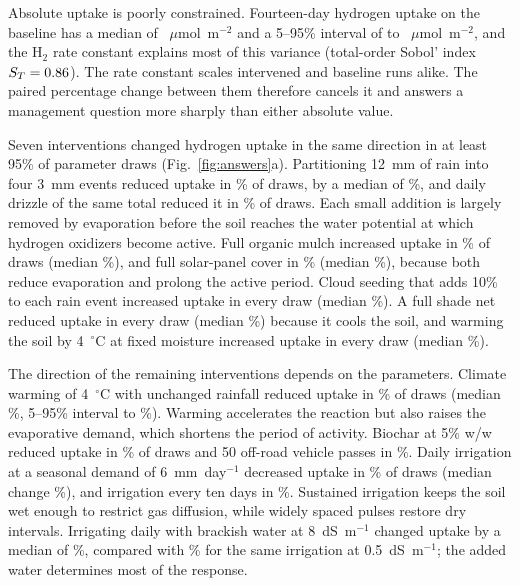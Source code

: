 \documentclass[11pt,a4paper]{article}
\begin{document}
Absolute uptake is poorly constrained. Fourteen-day hydrogen uptake on the baseline has a median of \QBaseHtwoMedian{}~$\mu$mol~m$^{-2}$ and a 5--95\% interval of \QBaseHtwoLow{} to \QBaseHtwoHigh{}~$\mu$mol~m$^{-2}$, and the H$_2$ rate constant explains most of this variance (total-order Sobol' index $S_T=0.86$). The rate constant scales intervened and baseline runs alike. The paired percentage change between them therefore cancels it and answers a management question more sharply than either absolute value.

Seven interventions changed hydrogen uptake in the same direction in at least 95\% of parameter draws (Fig.~\ref{fig:answers}a). Partitioning 12~mm of rain into four 3~mm events reduced uptake in \QRainFourPneg\% of draws, by a median of \QRainFourMedian\%, and daily drizzle of the same total reduced it in \QRainDrizzlePneg\% of draws. Each small addition is largely removed by evaporation before the soil reaches the water potential at which hydrogen oxidizers become active. Full organic mulch increased uptake in \QMulchFullPpos\% of draws (median \QMulchFullMedian\%), and full solar-panel cover in \QSolarFullPpos\% (median \QSolarFullMedian\%), because both reduce evaporation and prolong the active period. Cloud seeding that adds 10\% to each rain event increased uptake in every draw (median \QCloudTenMedian\%). A full shade net reduced uptake in every draw (median \QShadeFullMedian\%) because it cools the soil, and warming the soil by 4~$^\circ$C at fixed moisture increased uptake in every draw (median \QHotterSoilFourMedian\%).

The direction of the remaining interventions depends on the parameters. Climate warming of 4~$^\circ$C with unchanged rainfall reduced uptake in \QHotterFourPneg\% of draws (median \QHotterFourMedian\%, 5--95\% interval \QHotterFourLow{} to \QHotterFourHigh\%). Warming accelerates the reaction but also raises the evaporative demand, which shortens the period of activity. Biochar at 5\% w/w reduced uptake in \QBiocharFivePneg\% of draws and 50 off-road vehicle passes in \QCompactionFiftyPneg\%. Daily irrigation at a seasonal demand of 6~mm~day$^{-1}$ decreased uptake in \QDripDailyPneg\% of draws (median change \QDripDailyMedian\%), and irrigation every ten days in \QDripTenDayPneg\%. Sustained irrigation keeps the soil wet enough to restrict gas diffusion, while widely spaced pulses restore dry intervals. Irrigating daily with brackish water at 8~dS~m$^{-1}$ changed uptake by a median of \QSaltyEightMedian\%, compared with \QSaltyFreshDailyMedian\% for the same irrigation at 0.5~dS~m$^{-1}$; the added water determines most of the response.
\end{document}
